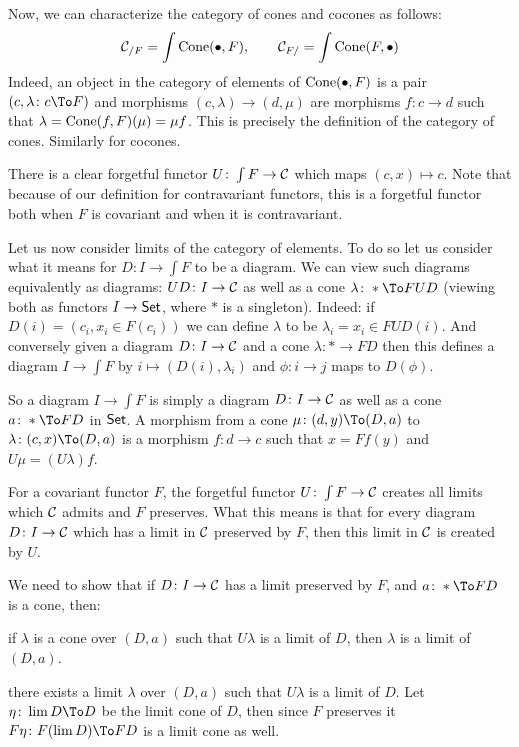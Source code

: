 Now, we can characterize the category of cones and cocones as follows:
$$ {{\cal C}}_{/F} = \int{\rm Cone}(\bullet,F),\qquad {{\cal C}}_{F/} = \int{\rm Cone}(F,\bullet) $$
Indeed, an object in the category of elements of ${\rm Cone}(\bullet,F)$ is a pair $(c,\lambda\colon c\To F)$ and morphisms $(c,\lambda)\to(d,\mu)$ are morphisms $f\colon c\to d$ such that
$\lambda={\rm Cone}(f,F)(\mu)=\mu f$.
This is precisely the definition of the category of cones.
Similarly for cocones.

There is a clear forgetful functor $U\colon\int F\to{{\cal C}}$ which maps $(c,x)\mapsto c$.
Note that because of our definition for contravariant functors, this is a forgetful functor both when $F$ is covariant and when it is contravariant.

Let us now consider limits of the category of elements.
To do so let us consider what it means for $D\colon I\to\int F$ to be a diagram.
We can view such diagrams equivalently as diagrams: $UD\colon I\to{{\cal C}}$ as well as a cone $\lambda\colon*\To FUD$ (viewing both as functors $I\to{\sf Set}$, where $*$ is a singleton).
Indeed: if $D(i)=(c_i,x_i\in F(c_i))$ we can define $\lambda$ to be $\lambda_i=x_i\in FUD(i)$.
And conversely given a diagram $D\colon I\to{{\cal C}}$ and a cone $\lambda\colon*\to FD$ then this defines a diagram $I\to\int F$ by $i\mapsto(D(i),\lambda_i)$ and $\phi\colon i\to j$ maps
to $D(\phi)$.

So a diagram $I\to\int F$ is simply a diagram $D\colon I\to{{\cal C}}$ as well as a cone $a\colon*\To FD$ in ${\sf Set}$.
A morphism from a cone $\mu\colon(d,y)\To(D,a)$ to $\lambda\colon(c,x)\To(D,a)$ is a morphism $f\colon d\to c$ such that $x=Ff(y)$ and $U\mu=(U\lambda)f$.

\bprop

    For a covariant functor $F$, the forgetful functor $U\colon\int F\to{{\cal C}}$ creates all limits which ${{\cal C}}$ admits and $F$ preserves.
    What this means is that for every diagram $D\colon I\to{{\cal C}}$ which has a limit in ${{\cal C}}$ preserved by $F$, then this limit in ${{\cal C}}$ is created by $U$.

\eprop

\bproof

    We need to show that if $D\colon I\to{{\cal C}}$ has a limit preserved by $F$, and $a\colon*\To FD$ is a cone, then:
    \benum
        \item if $\lambda$ is a cone over $(D,a)$ such that $U\lambda$ is a limit of $D$, then $\lambda$ is a limit of $(D,a)$.
        \item there exists a limit $\lambda$ over $(D,a)$ such that $U\lambda$ is a limit of $D$.
    \eenum
    Let $\eta\colon\lim D\To D$ be the limit cone of $D$, then since $F$ preserves it $F\eta\colon F(\lim D)\To FD$ is a limit cone as well.

